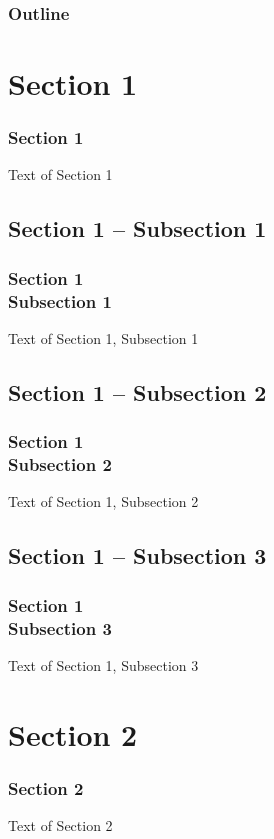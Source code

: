 \documentclass{beamer}
\begin{document}
\begin{frame}
\frametitle{Outline}

\end{frame}

\section[Sec1]{Section 1}

\begin{frame}
\frametitle{Section 1}

Text of Section 1
\end{frame}

\subsection[Sec1 Subsec1]{Section 1 -- Subsection 1}

\begin{frame}
\frametitle{Section 1\\Subsection 1}

Text of Section 1, Subsection 1
\end{frame}

\subsection[Sec1 Subsec2]{Section 1 -- Subsection 2}

\begin{frame}
\frametitle{Section 1\\Subsection 2}

Text of Section 1, Subsection 2
\end{frame}

\subsection[Sec1 Subsec3]{Section 1 -- Subsection 3}

\begin{frame}
\frametitle{Section 1\\Subsection 3}

Text of Section 1, Subsection 3
\end{frame}

\section[Sec2]{Section 2}

\begin{frame}
\frametitle{Section 2}

Text of Section 2
\end{frame}
\end{document}
